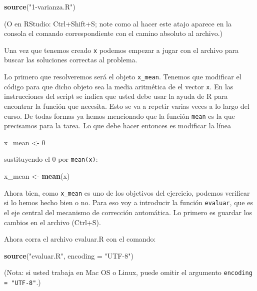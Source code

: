\documentclass[]{article}
\newenvironment{Shaded}{}{}
\newcommand{\KeywordTok}[1]{\textcolor[rgb]{0.00,0.44,0.13}{\textbf{{#1}}}}
\newcommand{\DataTypeTok}[1]{\textcolor[rgb]{0.56,0.13,0.00}{{#1}}}
\newcommand{\DecValTok}[1]{\textcolor[rgb]{0.25,0.63,0.44}{{#1}}}
\newcommand{\StringTok}[1]{\textcolor[rgb]{0.25,0.44,0.63}{{#1}}}
\newcommand{\NormalTok}[1]{{#1}}
\begin{document}
\begin{Shaded}
\begin{Highlighting}[]
\KeywordTok{source}\NormalTok{(}\StringTok{"1-varianza.R"}\NormalTok{)}
\end{Highlighting}
\end{Shaded}
(O en RStudio: Ctrl+Shift+S; note como al hacer este atajo aparece en la
consola el comando correspondiente con el camino absoluto al archivo.)

Una vez que tenemos creado \texttt{x} podemos empezar a jugar con el
archivo para buscar las soluciones correctas al problema.

Lo primero que resolveremos será el objeto \texttt{x\_mean}. Tenemos que
modificar el código para que dicho objeto sea la media aritmética de el
vector \texttt{x}. En las instrucciones del script se indica que usted
debe usar la ayuda de R para encontrar la función que necesita. Esto se
va a repetir varias veces a lo largo del curso. De todas formas ya hemos
mencionado que la función \texttt{mean} es la que precisamos para la
tarea. Lo que debe hacer entonces es modificar la línea

\begin{Shaded}
\begin{Highlighting}[]
\NormalTok{x_mean <- }\DecValTok{0}
\end{Highlighting}
\end{Shaded}
sustituyendo el 0 por \texttt{mean(x)}:

\begin{Shaded}
\begin{Highlighting}[]
\NormalTok{x_mean <- }\KeywordTok{mean}\NormalTok{(x)}
\end{Highlighting}
\end{Shaded}
Ahora bien, como \texttt{x\_mean} es uno de los objetivos del ejercicio,
podemos verificar si lo hemos hecho bien o no. Para eso voy a introducir
la función \texttt{evaluar}, que es el eje central del mecanismo de
corrección automática. Lo primero es guardar los cambios en el archivo
(Ctrl+S).

Ahora corra el archivo evaluar.R con el comando:

\begin{Shaded}
\begin{Highlighting}[]
\KeywordTok{source}\NormalTok{(}\StringTok{"evaluar.R"}\NormalTok{, }\DataTypeTok{encoding =} \StringTok{"UTF-8"}\NormalTok{)}
\end{Highlighting}
\end{Shaded}
(Nota: si usted trabaja en Mac OS o Linux, puede omitir el argumento
\texttt{encoding = "UTF-8"}.)
\end{document}
